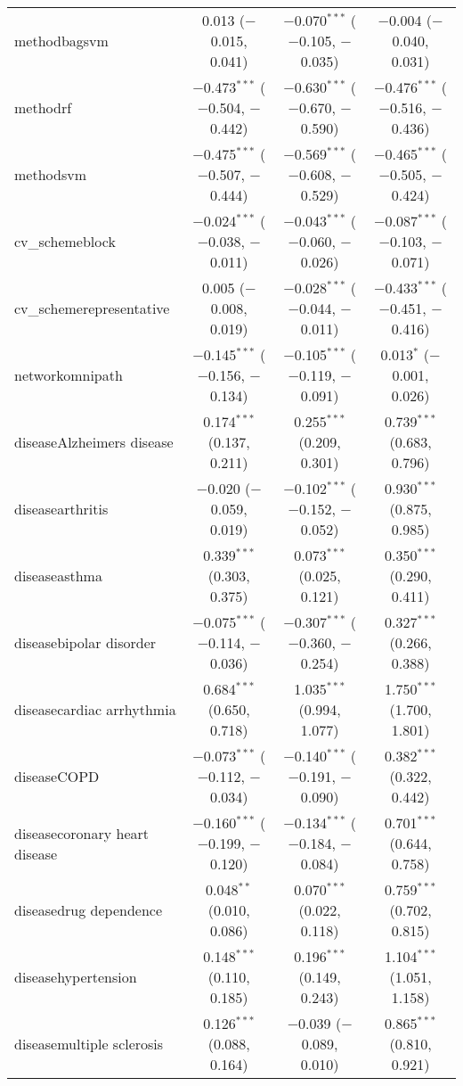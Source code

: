 \begin{table}[!htbp]
\begin{tabular}{@{\extracolsep{5pt}}lccc}
  methodbagsvm & 0.013 ($-$0.015, 0.041) & $-$0.070$^{***}$ ($-$0.105, $-$0.035) & $-$0.004 ($-$0.040, 0.031) \\ 
  methodrf & $-$0.473$^{***}$ ($-$0.504, $-$0.442) & $-$0.630$^{***}$ ($-$0.670, $-$0.590) & $-$0.476$^{***}$ ($-$0.516, $-$0.436) \\ 
  methodsvm & $-$0.475$^{***}$ ($-$0.507, $-$0.444) & $-$0.569$^{***}$ ($-$0.608, $-$0.529) & $-$0.465$^{***}$ ($-$0.505, $-$0.424) \\ 
  cv\_schemeblock & $-$0.024$^{***}$ ($-$0.038, $-$0.011) & $-$0.043$^{***}$ ($-$0.060, $-$0.026) & $-$0.087$^{***}$ ($-$0.103, $-$0.071) \\ 
  cv\_schemerepresentative & 0.005 ($-$0.008, 0.019) & $-$0.028$^{***}$ ($-$0.044, $-$0.011) & $-$0.433$^{***}$ ($-$0.451, $-$0.416) \\ 
  networkomnipath & $-$0.145$^{***}$ ($-$0.156, $-$0.134) & $-$0.105$^{***}$ ($-$0.119, $-$0.091) & 0.013$^{*}$ ($-$0.001, 0.026) \\ 
  diseaseAlzheimers disease & 0.174$^{***}$ (0.137, 0.211) & 0.255$^{***}$ (0.209, 0.301) & 0.739$^{***}$ (0.683, 0.796) \\ 
  diseasearthritis & $-$0.020 ($-$0.059, 0.019) & $-$0.102$^{***}$ ($-$0.152, $-$0.052) & 0.930$^{***}$ (0.875, 0.985) \\ 
  diseaseasthma & 0.339$^{***}$ (0.303, 0.375) & 0.073$^{***}$ (0.025, 0.121) & 0.350$^{***}$ (0.290, 0.411) \\ 
  diseasebipolar disorder & $-$0.075$^{***}$ ($-$0.114, $-$0.036) & $-$0.307$^{***}$ ($-$0.360, $-$0.254) & 0.327$^{***}$ (0.266, 0.388) \\ 
  diseasecardiac arrhythmia & 0.684$^{***}$ (0.650, 0.718) & 1.035$^{***}$ (0.994, 1.077) & 1.750$^{***}$ (1.700, 1.801) \\ 
  diseaseCOPD & $-$0.073$^{***}$ ($-$0.112, $-$0.034) & $-$0.140$^{***}$ ($-$0.191, $-$0.090) & 0.382$^{***}$ (0.322, 0.442) \\ 
  diseasecoronary heart disease & $-$0.160$^{***}$ ($-$0.199, $-$0.120) & $-$0.134$^{***}$ ($-$0.184, $-$0.084) & 0.701$^{***}$ (0.644, 0.758) \\ 
  diseasedrug dependence & 0.048$^{**}$ (0.010, 0.086) & 0.070$^{***}$ (0.022, 0.118) & 0.759$^{***}$ (0.702, 0.815) \\ 
  diseasehypertension & 0.148$^{***}$ (0.110, 0.185) & 0.196$^{***}$ (0.149, 0.243) & 1.104$^{***}$ (1.051, 1.158) \\ 
  diseasemultiple sclerosis & 0.126$^{***}$ (0.088, 0.164) & $-$0.039 ($-$0.089, 0.010) & 0.865$^{***}$ (0.810, 0.921) \\ 

\end{tabular}
\end{table}
